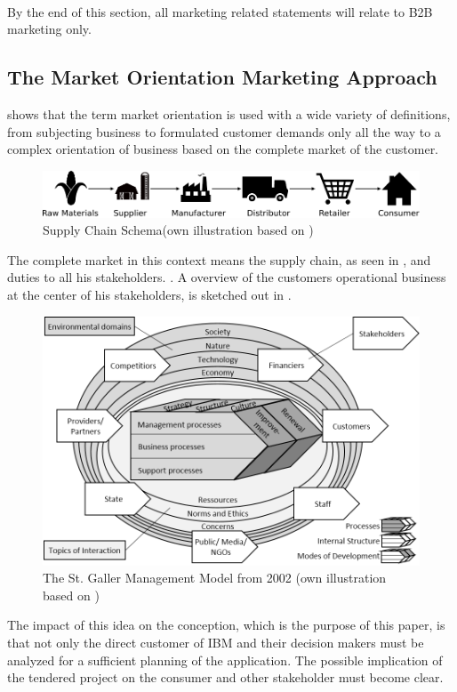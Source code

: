 \paragraph*{}By the end of this section, all marketing related statements will relate to B2B marketing only.
\subsection{The Market Orientation Marketing Approach}
\textcite[9-10]{Claen.2016} shows that the term market orientation is used with a wide variety of definitions, from subjecting business to formulated customer demands only all the way to a complex orientation of business based on the complete market of the customer.
\begin{figure}[H]
	\includegraphics[width=\textwidth]{img/supplychain.pdf}
	\caption[Supply Chain Schema]{Supply Chain Schema(own illustration based on \protect\cite{SouthwestTech})}
    	\label{fig:supplychain}
\end{figure}
The complete market in this context means the supply chain, as seen in , and duties to all his stakeholders. \parencite[cf.][22-23]{Claen.2016}. A overview of the customers operational business at the center of his stakeholders, is sketched out in .
\begin{figure}[H]
	\includegraphics[width=1\textwidth]{img/SGM.png}
	\caption[St. Galler Management Modell]{The St. Galler Management Model from 2002 (own illustration based on \protect\cite{RueggSturm.2003})}
	\label{fig:SGM}
\end{figure}
The impact of this idea on the conception, which is the purpose of this paper, is that not only the direct customer of IBM and their decision makers must be analyzed for a sufficient planning of the application. The possible implication of the tendered project on the consumer and other stakeholder must become clear.
